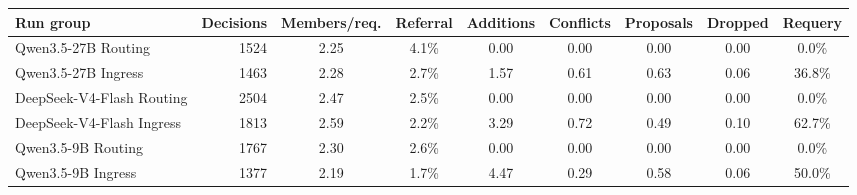 \begin{tabular}{l r c c c c c c c}
\toprule
Run group & Decisions & Members/req. & Referral & Additions & Conflicts & Proposals & Dropped & Requery \\
\midrule
Qwen3.5-27B Routing & 1524 & 2.25 & 4.1\% & 0.00 & 0.00 & 0.00 & 0.00 & 0.0\% \\
Qwen3.5-27B Ingress & 1463 & 2.28 & 2.7\% & 1.57 & 0.61 & 0.63 & 0.06 & 36.8\% \\
DeepSeek-V4-Flash Routing & 2504 & 2.47 & 2.5\% & 0.00 & 0.00 & 0.00 & 0.00 & 0.0\% \\
DeepSeek-V4-Flash Ingress & 1813 & 2.59 & 2.2\% & 3.29 & 0.72 & 0.49 & 0.10 & 62.7\% \\
Qwen3.5-9B Routing & 1767 & 2.30 & 2.6\% & 0.00 & 0.00 & 0.00 & 0.00 & 0.0\% \\
Qwen3.5-9B Ingress & 1377 & 2.19 & 1.7\% & 4.47 & 0.29 & 0.58 & 0.06 & 50.0\% \\
\bottomrule
\end{tabular}